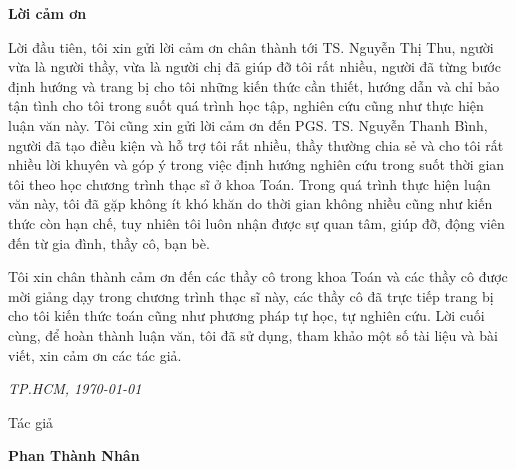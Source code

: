 \vspace*{3cm}

\begin{center}
\LARGE{\textbf{Lời cảm ơn}}
\end{center}


Lời đầu tiên, tôi xin gửi lời cảm ơn chân thành tới TS. Nguyễn Thị Thu, người vừa là người thầy, vừa là người chị đã giúp đỡ tôi rất nhiều, người đã từng bước định hướng và trang bị cho tôi những kiến thức cần thiết, hướng dẫn và chỉ bảo tận tình cho tôi trong suốt quá trình học tập, nghiên cứu cũng như thực hiện luận văn này. Tôi cũng xin gửi lời cảm ơn đến PGS. TS. Nguyễn Thanh Bình, người đã tạo điều kiện và hỗ trợ tôi rất nhiều, thầy thường chia sẻ và cho tôi rất nhiều lời khuyên và góp ý trong việc định hướng nghiên cứu trong suốt thời gian tôi theo học chương trình thạc sĩ ở khoa Toán. Trong quá trình thực hiện luận văn này, tôi đã gặp không ít khó khăn do thời gian không nhiều cũng như kiến thức còn hạn chế, tuy nhiên tôi luôn nhận được sự quan tâm, giúp đỡ, động viên đến từ gia đình, thầy cô, bạn bè.

Tôi xin chân thành cảm ơn đến các thầy cô trong khoa Toán và các thầy cô được mời giảng dạy trong chương trình thạc sĩ này, các thầy cô đã trực tiếp trang bị cho tôi kiến thức toán cũng như phương pháp tự học, tự nghiên cứu. Lời cuối cùng, để hoàn thành luận văn, tôi đã sử dụng, tham khảo một số tài liệu và bài viết, xin cảm ơn các tác giả.

\begin{flushright}
{\it TP.HCM, \today}

Tác giả\hskip 2.5cm\quad

\vskip 1cm

{\bf Phan Thành Nhân} \hskip 1cm \quad\ 
 \end{flushright}
\thispagestyle{empty}
